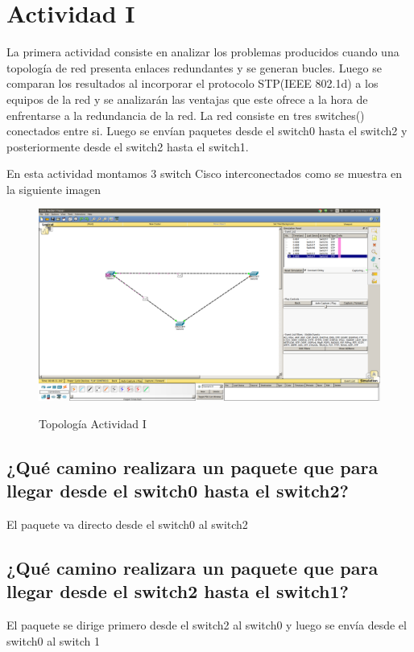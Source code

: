 \documentclass[spanish]{udpreport}
\begin{document}
\section{Actividad I}
La primera actividad consiste en analizar los problemas producidos cuando una topología de red presenta enlaces redundantes y se generan bucles. Luego se comparan los resultados al incorporar el protocolo STP(IEEE 802.1d) a los equipos de la red y se analizarán las ventajas que este ofrece a la hora de enfrentarse a la redundancia de la red.
La red consiste en tres switches()  conectados entre si. Luego se envían paquetes desde el switch0 hasta el switch2 y posteriormente desde el switch2 hasta el switch1.

En esta actividad montamos 3 switch Cisco interconectados como se muestra en la siguiente imagen 
\begin{figure}[H]
	\centering
	\includegraphics[scale=.25]{imagenes/A1.png}
	\label{fig:Figura 2.1}
	\caption{Topología Actividad I}
\end{figure}

\subsection{¿Qué camino realizara un paquete que para llegar desde el switch0 hasta el switch2?}
El paquete va directo desde el switch0 al switch2
\subsection{¿Qué camino realizara un paquete que para llegar desde el switch2 hasta el switch1?}
El paquete se dirige primero desde el switch2 al switch0 y luego se envía desde el switch0 al switch 1
\end{document}
